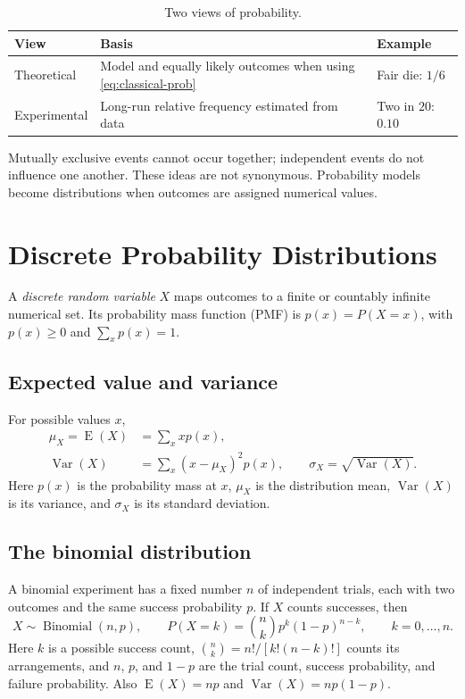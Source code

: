 \documentclass[11pt]{article}
\newcommand{\E}{\operatorname{E}}
\newcommand{\Var}{\operatorname{Var}}
\begin{document}
\begin{table}[ht]
\centering
\caption{Two views of probability.}
\begin{tabularx}{\textwidth}{@{}lYY@{}}
\toprule
View & Basis & Example \\
\midrule
Theoretical & Model and equally likely outcomes when using \eqref{eq:classical-prob} & Fair die: $1/6$ \\
Experimental & Long-run relative frequency estimated from data & Two in $20$: $0.10$ \\
\bottomrule
\end{tabularx}
\end{table}

\begin{keybox}
Mutually exclusive events cannot occur together; independent events do not
influence one another.  These ideas are not synonymous.  Probability models
become distributions when outcomes are assigned numerical values.
\end{keybox}

\section{Discrete Probability Distributions}\label{sec:discrete}
A \emph{discrete random variable} $X$ maps outcomes to a finite or countably
infinite numerical set.  Its probability mass function (PMF) is
$p(x)=P(X=x)$, with $p(x)\ge0$ and $\sum_xp(x)=1$.

\subsection{Expected value and variance}
For possible values $x$,
\begin{align}
\mu_X=\E(X)&=\sum_x x p(x),\label{eq:disc-mean}\\
\Var(X)&=\sum_x(x-\mu_X)^2p(x),\qquad
\sigma_X=\sqrt{\Var(X)}.\label{eq:disc-var}
\end{align}
Here $p(x)$ is the probability mass at $x$, $\mu_X$ is the distribution mean,
$\Var(X)$ is its variance, and $\sigma_X$ is its standard deviation.

\subsection{The binomial distribution}
A binomial experiment has a fixed number $n$ of independent trials, each
with two outcomes and the same success probability $p$.  If $X$ counts
successes, then
\begin{equation}\label{eq:binomial}
X\sim\operatorname{Binomial}(n,p),\qquad
P(X=k)=\binom nk p^k(1-p)^{n-k},\qquad k=0,\ldots,n.
\end{equation}
Here $k$ is a possible success count, $\binom nk=n!/[k!(n-k)!]$ counts its
arrangements, and $n$, $p$, and $1-p$ are the trial count, success
probability, and failure probability.  Also $\E(X)=np$ and
$\Var(X)=np(1-p)$.
\end{document}
